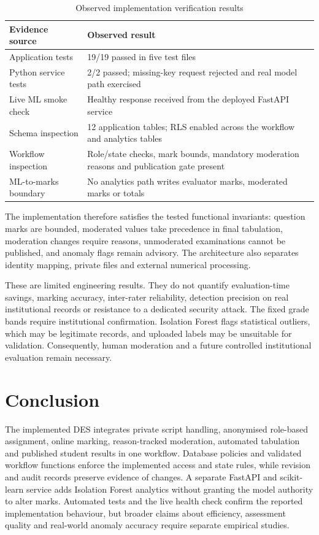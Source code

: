 \documentclass[conference]{IEEEtran}
\begin{document}
\begin{table}[t]
\centering
\caption{Observed implementation verification results}
\label{tab:results}
\begin{tabular}{p{2.25cm}p{4.95cm}}
\toprule
Evidence source & Observed result \\
\midrule
Application tests & 19/19 passed in five test files \\
Python service tests & 2/2 passed; missing-key request rejected and real model path exercised \\
Live ML smoke check & Healthy response received from the deployed FastAPI service \\
Schema inspection & 12 application tables; RLS enabled across the workflow and analytics tables \\
Workflow inspection & Role/state checks, mark bounds, mandatory moderation reasons and publication gate present \\
ML-to-marks boundary & No analytics path writes evaluator marks, moderated marks or totals \\
\bottomrule
\end{tabular}
\end{table}

The implementation therefore satisfies the tested functional invariants: question marks are bounded, moderated values take precedence in final tabulation, moderation changes require reasons, unmoderated examinations cannot be published, and anomaly flags remain advisory. The architecture also separates identity mapping, private files and external numerical processing.

These are limited engineering results. They do not quantify evaluation-time savings, marking accuracy, inter-rater reliability, detection precision on real institutional records or resistance to a dedicated security attack. The fixed grade bands require institutional confirmation. Isolation Forest flags statistical outliers, which may be legitimate records, and uploaded labels may be unsuitable for validation. Consequently, human moderation and a future controlled institutional evaluation remain necessary.

\section{Conclusion}
The implemented DES integrates private script handling, anonymised role-based assignment, online marking, reason-tracked moderation, automated tabulation and published student results in one workflow. Database policies and validated workflow functions enforce the implemented access and state rules, while revision and audit records preserve evidence of changes. A separate FastAPI and scikit-learn service adds Isolation Forest analytics without granting the model authority to alter marks. Automated tests and the live health check confirm the reported implementation behaviour, but broader claims about efficiency, assessment quality and real-world anomaly accuracy require separate empirical studies.
\end{document}
